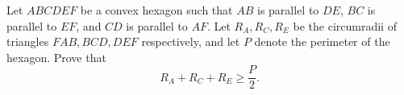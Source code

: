 Let $ABCDEF$ be a convex hexagon such that $AB$ is parallel to $DE$, $BC$ is parallel to $EF$, and $CD$ is parallel to $AF$. Let $R_A, R_C, R_E$ be the circumradii of triangles $FAB, BCD, DEF$ respectively, and let $P$ denote the perimeter of the hexagon. Prove that
\[ R_A + R_C + R_E \geq \frac{P}{2}. \]
